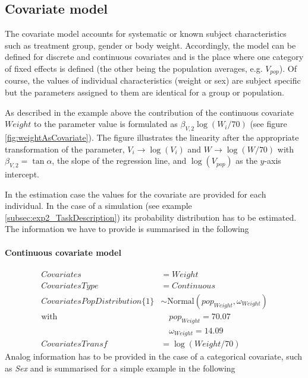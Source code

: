 \subsection{Covariate model}
\label{maths:covariate_model}

The covariate model accounts for systematic or known subject
characteristics such as treatment group, gender or body
weight. Accordingly, the model can be defined for discrete and
continuous covariates and is the place where one category of fixed
effects is defined (the other being
the population averages, e.g. $V_{pop}$). Of course, the values of
individual characteristics (weight or sex) are subject specific but
the parameters assigned to them are identical for a group or
population.

As described in the example above the contribution of the continuous
covariate $Weight$ to the parameter value is formulated as
$\beta_{V,2} \log(W_i/70)$ (see figure
\ref{fig:weightAsCovariate}). The figure illustrates the linearity
after the appropriate transformation of the parameter, $V_i
\longrightarrow \log(V_i)$ and $W \longrightarrow \log(W/70)$ with
$\beta_{V,2} = \tan{\alpha}$, the slope of the regression line, and
$\log(V_{pop})$ as the $y$-axis intercept.

In the estimation case the values for the covariate are provided for
each individual. In the case of a simulation (see example
\ref{subsec:exp2_TaskDescription}) its probability distribution has to
be estimated. The information we have to provide is summarised in the
following
\paragraph{Continuous covariate model}
\begin{align*}
Covariates & =  Weight  \\
CovariatesType & = Continuous  \\
CovariatesPopDistribution\{1\} & \sim \mbox{Normal}(pop_{Weight}, \omega_{Weight})  \\
 \text{with} & \quad pop_{Weight}=70.07 \\
 & \quad \omega_{Weight}=14.09  \\
CovariatesTransf & =\log(Weight/70) 
\end{align*}
Analog information has to be provided in the case of a categorical covariate, 
such as \textit{Sex} and is summarised for a simple example in the following

